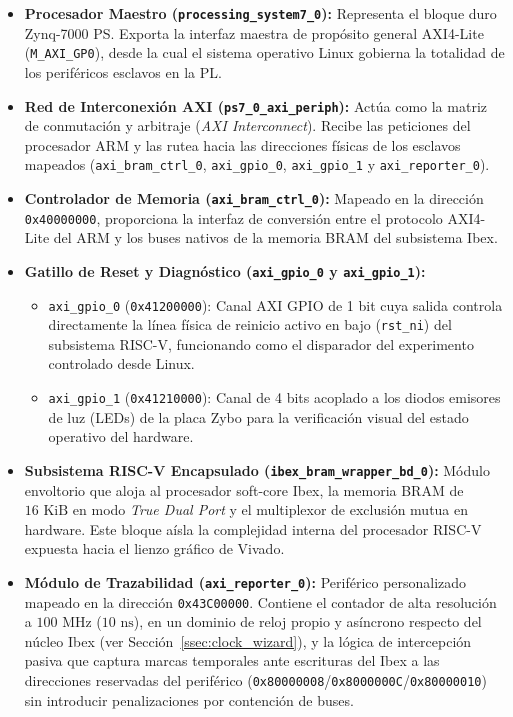\begin{itemize}
    \item \textbf{Procesador Maestro (\texttt{processing\_system7\_0}):} Representa el bloque duro Zynq-7000 PS. Exporta la interfaz maestra de propósito general AXI4-Lite (\texttt{M\_AXI\_GP0}), desde la cual el sistema operativo Linux gobierna la totalidad de los periféricos esclavos en la PL.
    
    \item \textbf{Red de Interconexión AXI (\texttt{ps7\_0\_axi\_periph}):} Actúa como la matriz de conmutación y arbitraje (\textit{AXI Interconnect}). Recibe las peticiones del procesador ARM y las rutea hacia las direcciones físicas de los esclavos mapeados (\texttt{axi\_bram\_ctrl\_0}, \texttt{axi\_gpio\_0}, \texttt{axi\_gpio\_1} y \texttt{axi\_reporter\_0}).

    \item \textbf{Controlador de Memoria (\texttt{axi\_bram\_ctrl\_0}):} Mapeado en la dirección \texttt{0x40000000}, proporciona la interfaz de conversión entre el protocolo AXI4-Lite del ARM y los buses nativos de la memoria BRAM del subsistema Ibex.

    \item \textbf{Gatillo de Reset y Diagnóstico (\texttt{axi\_gpio\_0} y \texttt{axi\_gpio\_1}):}
    \begin{itemize}
        \item \texttt{axi\_gpio\_0} (\texttt{0x41200000}): Canal AXI GPIO de 1 bit cuya salida controla directamente la línea física de reinicio activo en bajo (\texttt{rst\_ni}) del subsistema RISC-V, funcionando como el disparador del experimento controlado desde Linux.
        \item \texttt{axi\_gpio\_1} (\texttt{0x41210000}): Canal de 4 bits acoplado a los diodos emisores de luz (LEDs) de la placa Zybo para la verificación visual del estado operativo del hardware.
    \end{itemize}

    \item \textbf{Subsistema RISC-V Encapsulado (\texttt{ibex\_bram\_wrapper\_bd\_0}):} Módulo envoltorio que aloja al procesador soft-core Ibex, la memoria BRAM de $16\text{ KiB}$ en modo \textit{True Dual Port} y el multiplexor de exclusión mutua en hardware. Este bloque aísla la complejidad interna del procesador RISC-V expuesta hacia el lienzo gráfico de Vivado.

    \item \textbf{Módulo de Trazabilidad (\texttt{axi\_reporter\_0}):}
    Periférico personalizado mapeado en la dirección \texttt{0x43C00000}.
    Contiene el contador de alta resolución a $100\text{ MHz}$
    ($10\text{ ns}$), en un dominio de reloj propio y asíncrono respecto del núcleo Ibex (ver Sección~\ref{ssec:clock_wizard}), y la lógica de intercepción pasiva que captura marcas temporales ante escrituras del Ibex a las direcciones reservadas del periférico (\texttt{0x80000008}/\texttt{0x8000000C}/\texttt{0x80000010}) sin
    introducir penalizaciones por contención de buses.
\end{itemize}